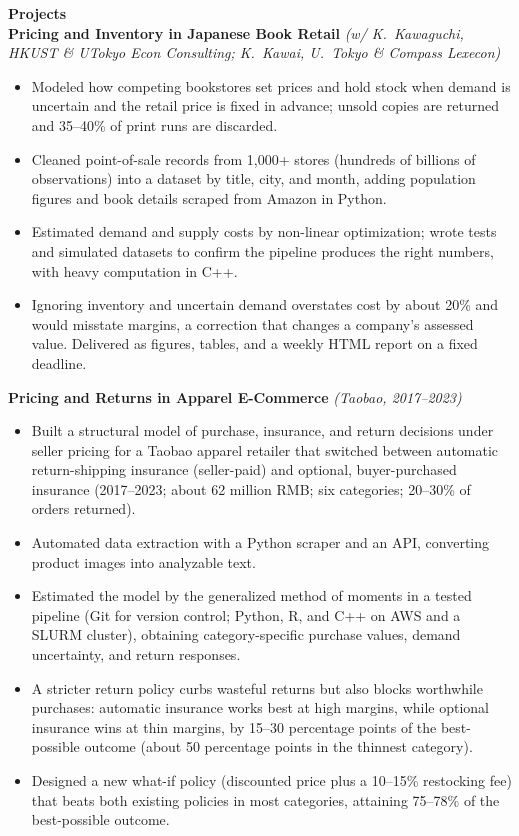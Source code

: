 \documentclass[11pt,letterpaper]{article}
\begin{document}
{\large \textbf{Projects}}\\[1pt]
\textbf{Pricing and Inventory in Japanese Book Retail} \textit{(w/ K.\ Kawaguchi, HKUST \& UTokyo Econ Consulting; K.\ Kawai, U.\ Tokyo \& Compass Lexecon)}\\
\vspace{1pt}
\begin{itemize}
  \item Modeled how competing bookstores set prices and hold stock when demand is uncertain and the retail price is fixed in advance; unsold copies are returned and 35--40\% of print runs are discarded.
  \item Cleaned point-of-sale records from 1{,}000+ stores (hundreds of billions of observations) into a dataset by title, city, and month, adding population figures and book details scraped from Amazon in Python.
  \item Estimated demand and supply costs by non-linear optimization; wrote tests and simulated datasets to confirm the pipeline produces the right numbers, with heavy computation in C++.
  \item Ignoring inventory and uncertain demand overstates cost by about 20\% and would misstate margins, a correction that changes a company's assessed value. Delivered as figures, tables, and a weekly HTML report on a fixed deadline.
\end{itemize}
\vspace{1pt}
\textbf{Pricing and Returns in Apparel E-Commerce} \textit{(Taobao, 2017--2023)}\\
\vspace{1pt}
\begin{itemize}
  \item Built a structural model of purchase, insurance, and return decisions under seller pricing for a Taobao apparel retailer that switched between automatic return-shipping insurance (seller-paid) and optional, buyer-purchased insurance (2017--2023; about 62 million RMB; six categories; 20--30\% of orders returned).
  \item Automated data extraction with a Python scraper and an API, converting product images into analyzable text.
  \item Estimated the model by the generalized method of moments in a tested pipeline (Git for version control; Python, R, and C++ on AWS and a SLURM cluster), obtaining category-specific purchase values, demand uncertainty, and return responses.
  \item A stricter return policy curbs wasteful returns but also blocks worthwhile purchases: automatic insurance works best at high margins, while optional insurance wins at thin margins, by 15--30 percentage points of the best-possible outcome (about 50 percentage points in the thinnest category).
  \item Designed a new what-if policy (discounted price plus a 10--15\% restocking fee) that beats both existing policies in most categories, attaining 75--78\% of the best-possible outcome.
\end{itemize}
\end{document}
